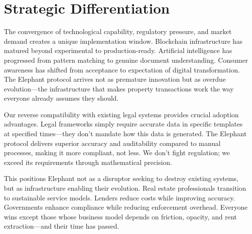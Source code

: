 \section{Strategic Differentiation}

The convergence of technological capability, regulatory pressure, and market demand creates a unique implementation window. Blockchain infrastructure has matured beyond experimental to production-ready. Artificial intelligence has progressed from pattern matching to genuine document understanding. Consumer awareness has shifted from acceptance to expectation of digital transformation. The Elephant protocol arrives not as premature innovation but as overdue evolution—the infrastructure that makes property transactions work the way everyone already assumes they should.

Our reverse compatibility with existing legal systems provides crucial adoption advantages. Legal frameworks simply require accurate data in specific templates at specified times—they don't mandate how this data is generated. The Elephant protocol delivers superior accuracy and auditability compared to manual processes, making it more compliant, not less. We don't fight regulation; we exceed its requirements through mathematical precision.

This positions Elephant not as a disruptor seeking to destroy existing systems, but as infrastructure enabling their evolution. Real estate professionals transition to sustainable service models. Lenders reduce costs while improving accuracy. Governments enhance compliance while reducing enforcement overhead. Everyone wins except those whose business model depends on friction, opacity, and rent extraction—and their time has passed.